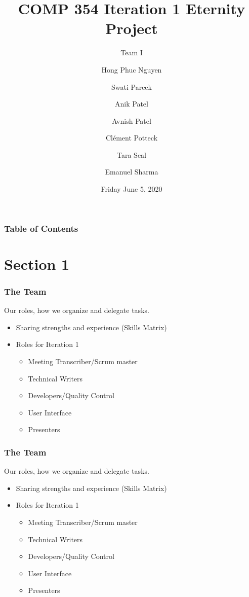 \documentclass{beamer}
\title{COMP 354 Iteration 1 Eternity Project}
\subtitle{Team I}
\author
  {Hong Phuc Nguyen 
  \and Swati Pareek 
  \and Anik Patel
  \and Avnish Patel 
  \and Clément Potteck 
  \and Tara Seal 
  \and Emanuel Sharma
  }
\institute{Concordia University}
\date{Friday June 5, 2020}
\begin{document}
  \frame{\titlepage}

  \begin{frame}
  \frametitle{Table of Contents}
  \tableofcontents
  \end{frame}

  \section{Section 1}

  \begin{frame}
  \frametitle{The Team}
  Our roles, how we organize and delegate tasks.
  \begin{itemize}
   \item Sharing strengths and experience (Skills Matrix)
   \item Roles for Iteration 1
    \begin{itemize}
     \item Meeting Transcriber/Scrum master
     \item Technical Writers
     \item Developers/Quality Control
     \item User Interface
     \item Presenters
    \end{itemize}
   \end{itemize}
  \end{frame}



  \begin{frame}
  \frametitle{The Team}
  Our roles, how we organize and delegate tasks.
  \begin{itemize}
   \item Sharing strengths and experience (Skills Matrix)
   \item Roles for Iteration 1
    \begin{itemize}
     \item Meeting Transcriber/Scrum master
     \item Technical Writers
     \item Developers/Quality Control
     \item User Interface
     \item Presenters
    \end{itemize}
   \end{itemize}
  \end{frame}
\end{document}
